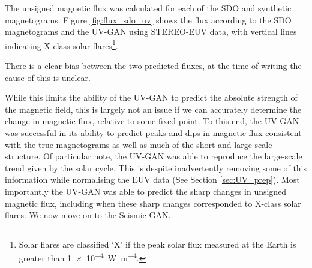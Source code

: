 \documentclass[11pt,a4paper,onecolumn]{report}
\begin{document}
The unsigned magnetic flux was calculated for each of the SDO and synthetic
magnetograms. Figure \ref{fig:flux_sdo_uv} shows the flux according to the SDO
magnetograms and the UV-GAN using STEREO-EUV data, with vertical lines
indicating X-class solar flares\footnote{Solar flares are classified `X' if the
peak solar flux measured at the Earth is greater than \SI{1e-4}{W.m^{-4}}.}.

There is a clear bias between the two predicted fluxes, at
the time of writing the cause of this is unclear.

While this limits the ability of the UV-GAN to predict the absolute strength of
the magnetic field, this is largely not an issue if we can accurately determine
the change in magnetic flux, relative to some fixed point.
To this end, the UV-GAN was successful in its ability to predict peaks and dips
in magnetic flux consistent with the true magnetograms as well as much of the
short and large scale structure. Of particular note, the UV-GAN was able to
reproduce the large-scale trend given by the solar cycle. This is despite
inadvertently removing some of this information while normalising the EUV data
(See Section \ref{sec:UV_prep}). Most importantly the UV-GAN was able to predict
the sharp changes in unsigned magnetic flux, including when these sharp changes
corresponded to X-class solar flares. We now move on to the Seismic-GAN. 
\end{document}
